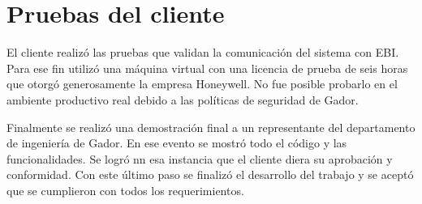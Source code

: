 \section{Pruebas del cliente}

El cliente realizó las pruebas que validan la comunicación del sistema con EBI.
Para ese fin utilizó una máquina virtual con una licencia de prueba de seis horas que otorgó generosamente la empresa Honeywell.
No fue posible probarlo en el ambiente productivo real debido a las políticas de seguridad de Gador.

Finalmente se realizó una demostración final a un representante del departamento de ingeniería de Gador.
En ese evento se mostró todo el código y las funcionalidades.
Se logró nn esa instancia que el cliente diera su aprobación y conformidad.
Con este último paso se finalizó el desarrollo del trabajo y se aceptó que se cumplieron con todos los requerimientos.
